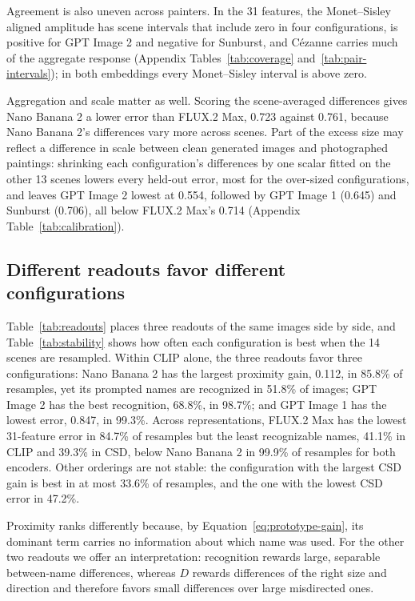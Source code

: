 \documentclass[10pt]{article}
\begin{document}
Agreement is also uneven across painters. In the 31 features, the Monet--Sisley aligned amplitude
has scene intervals that include zero in four configurations, is positive for GPT Image 2 and
negative for Sunburst, and C\'ezanne carries much of the aggregate response (Appendix
Tables~\ref{tab:coverage} and~\ref{tab:pair-intervals}); in both embeddings every Monet--Sisley
interval is above zero.

Aggregation and scale matter as well. Scoring the scene-averaged differences gives Nano Banana 2 a
lower error than FLUX.2 Max, 0.723 against 0.761, because Nano Banana 2's differences vary more
across scenes. Part of the excess size may reflect a difference in scale between clean generated
images and photographed paintings: shrinking each configuration's differences by one scalar fitted
on the other 13 scenes lowers every held-out error, most for the over-sized configurations, and
leaves GPT Image 2 lowest at 0.554, followed by GPT Image 1 (0.645) and Sunburst (0.706), all below
FLUX.2 Max's 0.714 (Appendix Table~\ref{tab:calibration}).

\subsection{Different readouts favor different configurations}\label{sec:readouts}




Table~\ref{tab:readouts} places three readouts of the same images side by side, and
Table~\ref{tab:stability} shows how often each configuration is best when the 14 scenes are
resampled. Within CLIP alone, the three readouts favor three configurations: Nano Banana 2 has the
largest proximity gain, 0.112, in 85.8\% of resamples, yet its prompted names are recognized in
51.8\% of images; GPT Image 2 has the best recognition, 68.8\%, in 98.7\%; and GPT Image 1 has the
lowest error, 0.847, in 99.3\%. Across representations, FLUX.2 Max has the lowest 31-feature error
in 84.7\% of resamples but the least recognizable names, 41.1\% in CLIP and 39.3\% in CSD, below
Nano Banana 2 in 99.9\% of resamples for both encoders. Other orderings are not stable: the
configuration with the largest CSD gain is best in at most 33.6\% of resamples, and the one with the
lowest CSD error in 47.2\%.

Proximity ranks differently because, by Equation~\ref{eq:prototype-gain}, its dominant term carries
no information about which name was used. For the other two readouts we offer an interpretation:
recognition rewards large, separable between-name differences, whereas $D$ rewards differences of
the right size and direction and therefore favors small differences over large misdirected ones.
\end{document}
